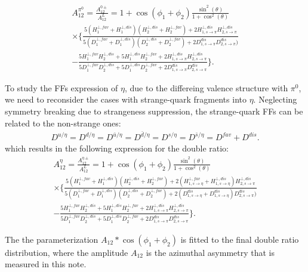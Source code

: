 \begin{multline}
A_{12}^{\pi^0}=\frac{A^{0\pm}_{12}}{A^L_{12}}=1+\cos(\phi_1+\phi_2)\frac{\sin^2(\theta)}{1+\cos^2(\theta)} \\
\times\bigg\{\frac{5(H^{\bot,fav}_1+H^{\bot,dis}_1)(H^{\bot,dis}_2+H^{\bot,fav}_2)+2H^{\bot,dis}_{1,s\rightarrow\pi}H^{\bot,dis}_{2,s\rightarrow\pi}}{5(D^{\bot,fav}_1+D^{\bot,dis}_1)(D^{\bot,dis}_2+D^{\bot,fav}_2)+2D^{dis}_{1,s\rightarrow\pi}D^{dis}_{2,s\rightarrow\pi})}\\
-\frac{5H^{\bot,fav}_1H^{\bot,dis}_2+5H^{\bot,dis}_1H^{\bot,fav}_2+2H^{\bot,dis}_{1,s\rightarrow\pi}H^{\bot,dis}_{2,s\rightarrow\pi}}{5D^{\bot,fav}_1D^{\bot,dis}_2+5D^{\bot,dis}_1D^{\bot,fav}_2+2D^{dis}_{1,s\rightarrow\pi}D^{dis}_{2,s\rightarrow\pi}} \bigg\}.
\label{eqn:FF5}
\end{multline}

To study the FFs expression of $\eta$, due to the differeing valence structure with $\pi^0$, we need to reconsider the cases with strange-quark fragments into $\eta$. Neglecting symmetry breaking due to strangeness suppression, the strange-quark FFs can be related to the non-strange ones:
\begin{equation}
\begin{aligned}
D^{u/{\eta}}=D^{d/{\eta}}=D^{\bar{u}/{\eta}}=D^{\bar{d}/{\eta}}=D^{s/{\eta}}=D^{\bar{s}/{\eta}}=D^{fav}+D^{dis}.
\label{eqn:FFetaquark}
\end{aligned}
\end{equation}
which results in the following expression for the double ratio:
\begin{multline}
A_{12}^{\eta}=\frac{A^{\eta\pm}_{12}}{A^L_{12}}=1+\cos(\phi_1+\phi_2)\frac{\sin^2(\theta)}{1+\cos^2(\theta)} \\
\times\bigg\{\frac{5(H^{\bot,fav}_1+H^{\bot,dis}_1)(H^{\bot,dis}_2+H^{\bot,fav}_2)+2(H^{\bot,fav}_{1,s\rightarrow\eta}+H^{\bot,dis}_{1,s\rightarrow\eta})H^{\bot,dis}_{2,s\rightarrow\pi}}{5(D^{\bot,fav}_1+D^{\bot,dis}_1)(D^{\bot,dis}_2+D^{\bot,fav}_2)+2(D^{dis}_{1,s\rightarrow\eta}+D^{dis}_{1,s\rightarrow\eta})D^{dis}_{2,s\rightarrow\pi})}\\
-\frac{5H^{\bot,fav}_1H^{\bot,dis}_2+5H^{\bot,dis}_1H^{\bot,fav}_2+2H^{\bot,dis}_{1,s\rightarrow\pi}H^{\bot,dis}_{2,s\rightarrow\pi}}{5D^{\bot,fav}_1D^{\bot,dis}_2+5D^{\bot,dis}_1D^{\bot,fav}_2+2D^{dis}_{1,s\rightarrow\pi}D^{dis}_{2,s\rightarrow\pi}} \bigg\}.
\label{eqn:FF5eta}
\end{multline}

The the parameterization $A_{12}*\cos(\phi_1+\phi_2)$ is fitted to the final double ratio distribution, where the amplitude $A_{12}$ is the azimuthal asymmetry that is measured in this note. 